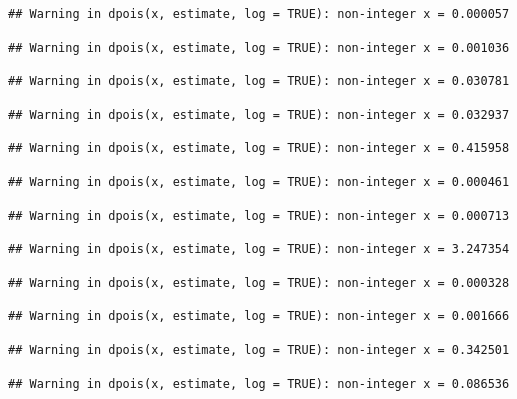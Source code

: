 \documentclass[]{article}
\begin{document}
\begin{verbatim}
## Warning in dpois(x, estimate, log = TRUE): non-integer x = 0.000057
\end{verbatim}

\begin{verbatim}
## Warning in dpois(x, estimate, log = TRUE): non-integer x = 0.001036
\end{verbatim}

\begin{verbatim}
## Warning in dpois(x, estimate, log = TRUE): non-integer x = 0.030781
\end{verbatim}

\begin{verbatim}
## Warning in dpois(x, estimate, log = TRUE): non-integer x = 0.032937
\end{verbatim}

\begin{verbatim}
## Warning in dpois(x, estimate, log = TRUE): non-integer x = 0.415958
\end{verbatim}

\begin{verbatim}
## Warning in dpois(x, estimate, log = TRUE): non-integer x = 0.000461
\end{verbatim}

\begin{verbatim}
## Warning in dpois(x, estimate, log = TRUE): non-integer x = 0.000713
\end{verbatim}

\begin{verbatim}
## Warning in dpois(x, estimate, log = TRUE): non-integer x = 3.247354
\end{verbatim}

\begin{verbatim}
## Warning in dpois(x, estimate, log = TRUE): non-integer x = 0.000328
\end{verbatim}

\begin{verbatim}
## Warning in dpois(x, estimate, log = TRUE): non-integer x = 0.001666
\end{verbatim}

\begin{verbatim}
## Warning in dpois(x, estimate, log = TRUE): non-integer x = 0.342501
\end{verbatim}

\begin{verbatim}
## Warning in dpois(x, estimate, log = TRUE): non-integer x = 0.086536
\end{verbatim}
\end{document}

